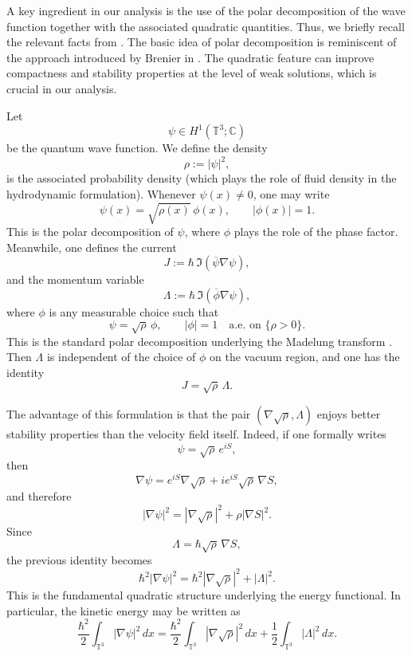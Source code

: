 \documentclass[11pt]{article}
\begin{document}
A key ingredient in our analysis is the use of the polar decomposition of the wave function together with the associated quadratic quantities. Thus, we briefly recall the relevant facts from \cite{AntonelliMarcati2009,AntonelliMarcati2012}. The basic idea of polar decomposition  is reminiscent of the approach introduced by Brenier in \cite{Brenier1991}. 
The quadratic feature can improve compactness and stability properties at the level of weak solutions, which is crucial in our analysis.

Let $$   \psi \in H^1(\mathbb{T}^3; \mathbb{C})   $$ be the quantum wave function.
  We define the density
\[
\rho:=|\psi|^2,
\]
is the associated probability density (which plays the role of fluid density in the hydrodynamic formulation).
Whenever \(\psi(x)\neq0\), one may write
\[
\psi(x)=\sqrt{\rho(x)}\,\phi(x),
\qquad |\phi(x)|=1.
\]
This is the polar decomposition of \(\psi\), where \(\phi\) plays the role of the phase factor. Meanwhile,  one defines the current
\[
J:=\hbar\,\Im(\overline{\psi}\nabla\psi),
\]
and the momentum variable
\[
\Lambda:=\hbar\,\Im(\overline{\phi}\nabla\psi),
\]
where \(\phi\) is any measurable choice such that
\[
\psi=\sqrt{\rho}\,\phi,
\qquad |\phi|=1 \quad \text{a.e. on } \{\rho>0\}.
\]
This is the standard polar decomposition underlying the Madelung transform \cite{Mad}.
Then \(\Lambda\) is independent of the choice of \(\phi\) on the vacuum region, and one has the identity
\[
J=\sqrt{\rho}\,\Lambda.
\]




The advantage of this formulation is that the pair \((\nabla\sqrt{\rho},\Lambda)\) enjoys better stability properties than the velocity field itself. Indeed, if one formally writes
\[
\psi=\sqrt{\rho}\,e^{iS},
\]
then
\[
\nabla\psi
=
e^{iS}\nabla\sqrt{\rho}
+
i e^{iS}\sqrt{\rho}\,\nabla S,
\]
and therefore
\[
|\nabla\psi|^2
=
|\nabla\sqrt{\rho}|^2+\rho|\nabla S|^2.
\]
Since
\[
\Lambda=\hbar\sqrt{\rho}\,\nabla S,
\]
the previous identity becomes
\begin{equation}\label{eq:quadratic-identity}
\hbar^2|\nabla\psi|^2
=
\hbar^2|\nabla\sqrt{\rho}|^2+|\Lambda|^2.
\end{equation}
This is the fundamental quadratic structure underlying the energy functional. In particular, the kinetic energy may be written as
\[
\frac{\hbar^2}{2}\int_{\mathbb{T}^3}|\nabla\psi|^2\,dx
=
\frac{\hbar^2}{2}\int_{\mathbb{T}^3}|\nabla\sqrt{\rho}|^2\,dx
+
\frac12\int_{\mathbb{T}^3}|\Lambda|^2\,dx.
\]
\end{document}
